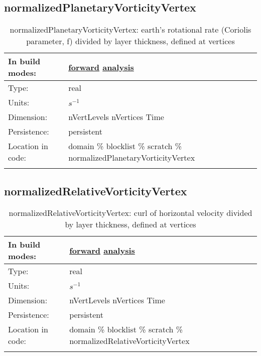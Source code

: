 \subsection[normalizedPlanetaryVorticityVertex]{normalizedPlanetaryVorticityVertex}
\label{subsec:var_sec_scratch_normalizedPlanetaryVorticityVertex}
\begin{center}
\begin{longtable}{| p{2.0in} | p{4.0in} |}
        \hline 
        In build modes: & \hyperref[subsec:forward_var_tab_scratch]{forward} \hyperref[subsec:analysis_var_tab_scratch]{analysis} \\
        \hline 
        Type: & real \\
        \hline 
        Units: & $s^{-1}$ \\
        \hline 
        Dimension: & nVertLevels nVertices Time \\
        \hline 
        Persistence: & persistent \\
        \hline 
		 Location in code: & domain \% blocklist \% scratch \% normalizedPlanetaryVorticityVertex \\
		 \hline 
    \caption{normalizedPlanetaryVorticityVertex: earth's rotational rate (Coriolis parameter, f) divided by layer thickness, defined at vertices}
\end{longtable}
\end{center}
\subsection[normalizedRelativeVorticityVertex]{normalizedRelativeVorticityVertex}
\label{subsec:var_sec_scratch_normalizedRelativeVorticityVertex}
\begin{center}
\begin{longtable}{| p{2.0in} | p{4.0in} |}
        \hline 
        In build modes: & \hyperref[subsec:forward_var_tab_scratch]{forward} \hyperref[subsec:analysis_var_tab_scratch]{analysis} \\
        \hline 
        Type: & real \\
        \hline 
        Units: & $s^{-1}$ \\
        \hline 
        Dimension: & nVertLevels nVertices Time \\
        \hline 
        Persistence: & persistent \\
        \hline 
		 Location in code: & domain \% blocklist \% scratch \% normalizedRelativeVorticityVertex \\
		 \hline 
    \caption{normalizedRelativeVorticityVertex: curl of horizontal velocity divided by layer thickness, defined at vertices}
\end{longtable}
\end{center}
